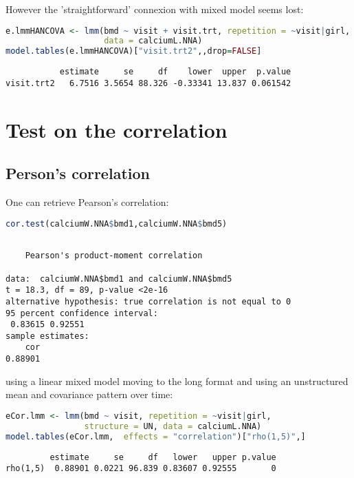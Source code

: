 \documentclass[12pt]{article}
\begin{document}
However the 'straightforward' connexion with mixed model seems lost:
\begin{lstlisting}[language=r,numbers=none]
e.lmmHANCOVA <- lmm(bmd ~ visit + visit.trt, repetition = ~visit|girl, structure = UN(~grp),
                    data = calciumL.NNA)
model.tables(e.lmmHANCOVA)["visit.trt2",,drop=FALSE]
\end{lstlisting}

\label{}
\begin{verbatim}
           estimate     se     df    lower  upper  p.value
visit.trt2   6.7516 3.5654 88.326 -0.33341 13.837 0.061542
\end{verbatim}


\clearpage
\section{Test on the correlation}
\label{sec:orge235a42}

\subsection{Person's correlation}
\label{sec:org5102c38}

One can retrieve Pearson's correlation:
\begin{lstlisting}[language=r,numbers=none]
cor.test(calciumW.NNA$bmd1,calciumW.NNA$bmd5)
\end{lstlisting}

\label{}
\begin{verbatim}

	Pearson's product-moment correlation

data:  calciumW.NNA$bmd1 and calciumW.NNA$bmd5
t = 18.3, df = 89, p-value <2e-16
alternative hypothesis: true correlation is not equal to 0
95 percent confidence interval:
 0.83615 0.92551
sample estimates:
    cor 
0.88901
\end{verbatim}

using a linear mixed model moving to the long format and using an
unstructured mean and covariance pattern over time:
\begin{lstlisting}[language=r,numbers=none]
eCor.lmm <- lmm(bmd ~ visit, repetition = ~visit|girl,
                structure = UN, data = calciumL.NNA)
model.tables(eCor.lmm,  effects = "correlation")["rho(1,5)",]
\end{lstlisting}

\label{}
\begin{verbatim}
         estimate     se     df   lower   upper p.value
rho(1,5)  0.88901 0.0221 96.839 0.83607 0.92555       0
\end{verbatim}
\end{document}

